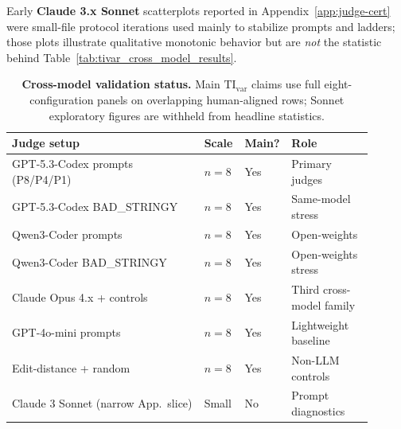 \documentclass{article}
\begin{document}
Early \textbf{Claude 3.x Sonnet} scatterplots reported in Appendix~\ref{app:judge-cert} were small-file protocol iterations used mainly to stabilize prompts and ladders; those plots illustrate qualitative monotonic behavior but are \emph{not} the statistic behind Table~\ref{tab:tivar_cross_model_results}.

\begin{table}[t]
  \centering
  \scriptsize
  \setlength{\tabcolsep}{3pt}%
  \begin{tabular}{@{}>{\raggedright\arraybackslash}p{0.52\linewidth}
    >{\centering\arraybackslash}p{0.09\linewidth}
    >{\centering\arraybackslash}p{0.07\linewidth}
    >{\raggedright\arraybackslash}p{0.22\linewidth}@{}}
    \toprule
    \textbf{Judge setup}                 &
    \textbf{Scale}                       &
    \textbf{Main?}                       &
    \textbf{Role}                                                                     \\
    \midrule
    GPT-5.3-Codex prompts (P8/P4/P1)     & \(n{=}8\) & Yes & Primary judges           \\
    GPT-5.3-Codex BAD\_STRINGY           & \(n{=}8\) & Yes & Same-model stress        \\
    Qwen3-Coder prompts                  & \(n{=}8\) & Yes & Open-weights             \\
    Qwen3-Coder BAD\_STRINGY             & \(n{=}8\) & Yes & Open-weights stress      \\
    Claude Opus 4.x + controls           & \(n{=}8\) & Yes & Third cross-model family \\
    GPT-4o-mini prompts                  & \(n{=}8\) & Yes & Lightweight baseline     \\
    Edit-distance + random               & \(n{=}8\) & Yes & Non-LLM controls         \\
    Claude 3 Sonnet (narrow App.\ slice) & Small     & No  & Prompt diagnostics       \\
    \bottomrule
  \end{tabular}
  \caption{\textbf{Cross-model validation status.}
  Main \(\mathrm{TI}_{\mathrm{var}}\) claims use full eight-configuration panels on overlapping human-aligned rows; Sonnet exploratory figures are withheld from headline statistics.}
  \label{tab:app-cross-model-status}
\end{table}
\end{document}
